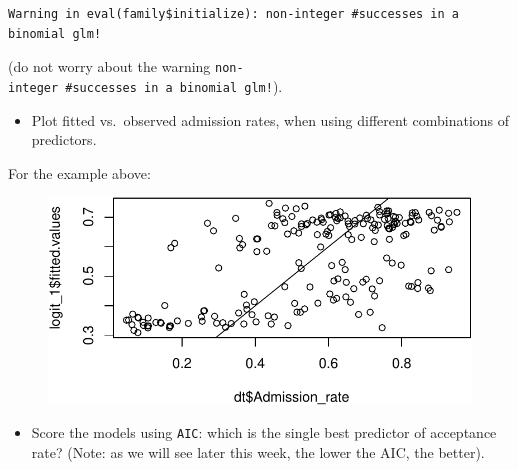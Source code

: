 \documentclass[
  letterpaper,
  DIV=11,
  numbers=noendperiod]{scrreprt}
\newenvironment{Shaded}{\begin{snugshade}}{\end{snugshade}}
\newcommand{\DecValTok}[1]{\textcolor[rgb]{0.68,0.00,0.00}{#1}}
\newcommand{\FunctionTok}[1]{\textcolor[rgb]{0.28,0.35,0.67}{#1}}
\newcommand{\NormalTok}[1]{\textcolor[rgb]{0.00,0.23,0.31}{#1}}
\newcommand{\SpecialCharTok}[1]{\textcolor[rgb]{0.37,0.37,0.37}{#1}}
\providecommand{\tightlist}{%
  \setlength{\itemsep}{0pt}\setlength{\parskip}{0pt}}\usepackage{longtable,booktabs,array}
\begin{document}
\begin{verbatim}
Warning in eval(family$initialize): non-integer #successes in a binomial glm!
\end{verbatim}

(do not worry about the warning
\texttt{non-integer\ \#successes\ in\ a\ binomial\ glm!}).

\begin{itemize}
\tightlist
\item
  Plot fitted vs.~observed admission rates, when using different
  combinations of predictors.
\end{itemize}

For the example above:

\begin{Shaded}
\end{Shaded}

\begin{figure}[H]

{\centering \includegraphics{./13-generalized_linear_models_files/figure-pdf/unnamed-chunk-10-1.pdf}

}

\end{figure}

\begin{itemize}
\tightlist
\item
  Score the models using \texttt{AIC}: which is the single best
  predictor of acceptance rate? (Note: as we will see later this week,
  the lower the AIC, the better).
\end{itemize}
\end{document}
